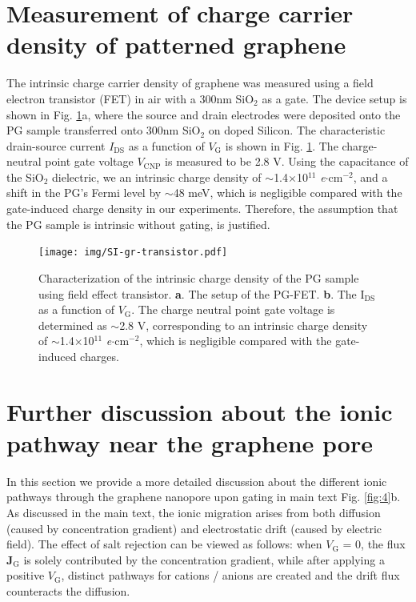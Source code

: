\documentclass[journal=langd5,email=true, hyperref=true, keywords=false]{achemso}
\begin{document}
\section{Measurement of charge carrier density of patterned graphene}
\label{sec:charge-dens}
The intrinsic charge carrier density of graphene was measured using a
field electron transistor (FET) in air with a 300nm SiO$_2$ as a
gate. The device setup is shown in Fig. \ref{fig:charge-dens}a,
where the source and drain electrodes were deposited onto the PG
sample transferred onto 300nm SiO$_2$ on doped Silicon. The
characteristic drain-source current $I_{\mathrm{DS}}$ as a function of
$V_{\mathrm{G}}$ is shown in Fig. \ref{fig:charge-dens}. The
charge-neutral point gate voltage $V_{\mathrm{CNP}}$ is measured to be 2.8 V.
Using the capacitance of the SiO$_{2}$ dielectric, we an intrinsic
charge density of $\sim{}$1.4$\times$10$^{11}$
\textit{e}$\cdot$cm$^{-2}$, and a shift in the PG's Fermi level by
$\sim{}$48 meV, which is negligible compared with the gate-induced
charge density in our experiments. Therefore, the assumption that the
PG sample is intrinsic without gating, is justified.

\begin{figure}[htbp]
  \centering
  \texttt{[image: img/SI-gr-transistor.pdf]}
  \caption{Characterization of the intrinsic charge density of the PG
    sample using field effect transistor. \textbf{a}. The setup of the
    PG-FET. \textbf{b}. The I$_{\mathrm{DS}}$ as a function of
    $V_{\mathrm{G}}$. The charge neutral point gate voltage is
    determined as $\sim{}$2.8 V, corresponding to an intrinsic charge
    density of $\sim{}$1.4$\times$10$^{11}$
    \textit{e}$\cdot$cm$^{-2}$, which is negligible compared with the
    gate-induced charges.}
  \label{fig:charge-dens}
\end{figure}

\pagebreak

\section{Further discussion about the ionic pathway near the graphene pore}
\label{sec:conc}

In this section we provide a more detailed discussion about the
different ionic pathways through the graphene nanopore upon gating in
main text Fig. \ref{fig:4}b. As discussed in the main text, the
ionic migration arises from both diffusion (caused by
concentration gradient) and electrostatic drift (caused by electric
field).  The effect of salt rejection can be viewed as follows: when
$V_{\mathrm{G}}$ = 0, the flux $\boldsymbol{J}_{\mathrm{G}}$ is solely
contributed by the concentration gradient, while after applying a
positive $V_{\mathrm{G}}$, distinct pathways for cations /
anions are created and the drift flux counteracts the diffusion.
\end{document}
